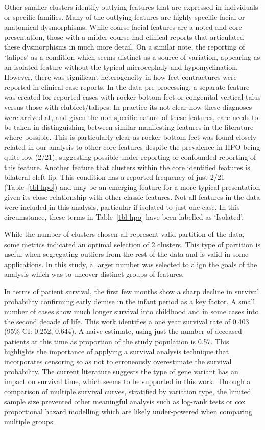 \documentclass[
  authoryear,
  preprint,
  3p]{elsarticle}
\begin{document}
Other smaller clusters identify outlying features that are expressed in
individuals or specific families. Many of the outlying features are
highly specific facial or anatomical dysmorphisms. While coarse facial
features are a noted and core presentation, those with a milder course
had clinical reports that articulated these dysmorphisms in much more
detail. On a similar note, the reporting of `talipes' as a condition
which seems distinct as a source of variation, appearing as an isolated
feature without the typical microcephaly and hypomyelination. However,
there was significant heterogeneity in how feet contractures were
reported in clinical case reports. In the data pre-processing, a
separate feature was created for reported cases with rocker bottom feet
or congenital vertical talus versus those with clubfeet/talipes. In
practice its not clear how these diagnoses were arrived at, and given
the non-specific nature of these features, care needs to be taken in
distinguishing between similar manifesting features in the literature
where possible. This is particularly clear as rocker bottom feet was
found closely related in our analysis to other core features despite the
prevalence in HPO being quite low (2/21), suggesting possible
under-reporting or confounded reporting of this feature. Another feature
that clusters within the core identified features is bilateral cleft
lip. This condition has a reported frequency of just 2/21
(Table~\ref{tbl-hpo}) and may be an emerging feature for a more typical
presentation given its close relationship with other classic features.
Not all features in the data were included in this analysis, particular
if isolated to just one case. In this circumstance, these terms in
Table~\ref{tbl-hpo} have been labelled as `Isolated'.

While the number of clusters chosen all represent valid partition of the
data, some metrics indicated an optimal selection of 2 clusters. This
type of partition is useful when segregating outliers from the rest of
the data and is valid in some applications. In this study, a larger
number was selected to align the goals of the analysis which was to
uncover distinct groups of features.

In terms of patient survival, the first few months show a sharp decline
in survival probability confirming early demise in the infant period as
a key factor. A small number of cases show much longer survival into
childhood and in some cases into the second decade of life. This work
identifies a one year survival rate of 0.403 (95\% CI: 0.252, 0.644). A
naive estimate, using just the number of deceased patients at this time
as proportion of the study population is 0.57. This highlights the
importance of applying a survival analysis technique that incorporates
censoring so as not to erroneously overestimate the survival
probability. The current literature suggests the type of gene variant
has an impact on survival time, which seems to be supported in this
work. Through a comparison of multiple survival curves, stratified by
variation type, the limited sample size prevented other meaningful
analysis such as log-rank tests or cox proportional hazard modelling
which are likely under-powered when comparing multiple groups.
\end{document}
